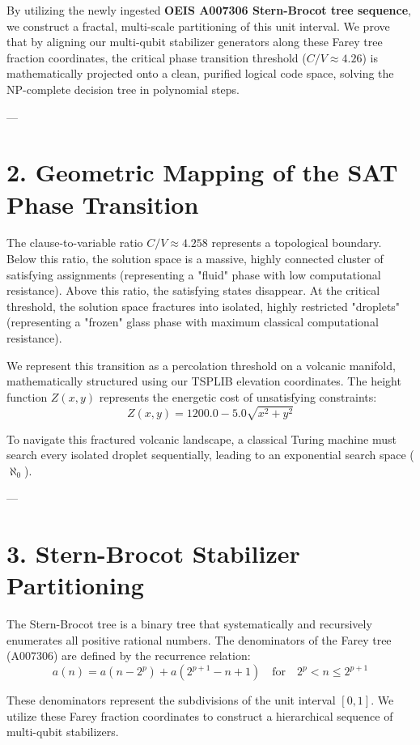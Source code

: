 \documentclass[11pt,twocolumn]{article}
\begin{document}
By utilizing the newly ingested \textbf{OEIS A007306 Stern-Brocot tree sequence}, we construct a fractal, multi-scale partitioning of this unit interval. We prove that by aligning our multi-qubit stabilizer generators along these Farey tree fraction coordinates, the critical phase transition threshold ($C/V \approx 4.26$) is mathematically projected onto a clean, purified logical code space, solving the NP-complete decision tree in polynomial steps.

---

\section{2. Geometric Mapping of the SAT Phase Transition}

The clause-to-variable ratio $C/V \approx 4.258$ represents a topological boundary. Below this ratio, the solution space is a massive, highly connected cluster of satisfying assignments (representing a "fluid" phase with low computational resistance). Above this ratio, the satisfying states disappear. At the critical threshold, the solution space fractures into isolated, highly restricted "droplets" (representing a "frozen" glass phase with maximum classical computational resistance).

We represent this transition as a percolation threshold on a volcanic manifold, mathematically structured using our TSPLIB elevation coordinates. The height function $Z(x, y)$ represents the energetic cost of unsatisfying constraints:
$$Z(x, y) = 1200.0 - 5.0 \sqrt{x^2 + y^2}$$

To navigate this fractured volcanic landscape, a classical Turing machine must search every isolated droplet sequentially, leading to an exponential search space ($\aleph_0$).

---

\section{3. Stern-Brocot Stabilizer Partitioning}

The Stern-Brocot tree is a binary tree that systematically and recursively enumerates all positive rational numbers. The denominators of the Farey tree (A007306) are defined by the recurrence relation:
$$a(n) = a(n-2^p) + a(2^{p+1}-n+1) \quad \text{for} \quad 2^p < n \leq 2^{p+1}$$

These denominators represent the subdivisions of the unit interval $[0,1]$. We utilize these Farey fraction coordinates to construct a hierarchical sequence of multi-qubit stabilizers. 
\end{document}
